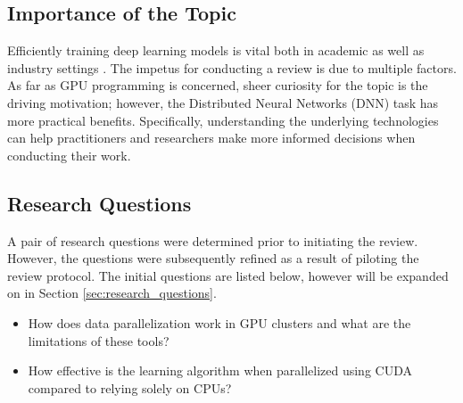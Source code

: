 \subsection{Importance of the Topic}
\label{sec:importance_of_topic}
Efficiently training deep learning models is vital both in academic as well as industry settings
\cite{chahal_hitchhikers_2018, xing_strategies_2015}. The impetus for conducting a review
is due to multiple factors. As far as GPU programming is concerned, sheer curiosity for the topic is
the driving motivation; however, the Distributed Neural Networks (DNN) task has more practical benefits.
Specifically, understanding the underlying technologies can help practitioners and researchers make more
informed decisions when conducting their work.

\subsection{Research Questions}
\label{sec:initial_research_questions}
A pair of research questions were determined prior to initiating the review. However, the questions
were subsequently refined as a result of piloting the review protocol. The initial questions are listed below,
however will be expanded on in Section \ref{sec:research_questions}.

\begin{itemize}
	\item How does data parallelization work in GPU clusters and what are the limitations of these tools?
	\item How effective is the learning algorithm when parallelized using CUDA compared to relying solely on
	      CPUs?
\end{itemize}



